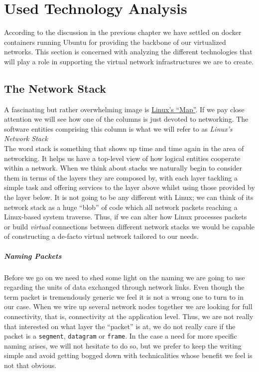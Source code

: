 \chapter{Used Technology Analysis} \label{chap:2}
    According to the discussion in the previous chapter we have settled on docker containers running Ubuntu for providing the backbone of our virtualized networks. This section is concerned with analyzing the different technologies that will play a role in supporting the virtual network infrastructures we are to create.\\

    \section{The Network Stack}
        A fascinating but rather overwhelming image is \href{https://upload.wikimedia.org/wikipedia/commons/5/5b/Linux_kernel_map.png}{Linux's ``Map''}. If we pay close attention we will see how one of the columns is just devoted to networking. The software entities comprising this column is what we will refer to as \textit{Linux's Network Stack}\\

         The word stack is something that shows up time and time again in the area of networking. It helps us have a top-level view of how logical entities cooperate within a network. When we think about stacks we naturally begin to consider them in terms of the layers they are composed by, with each layer tackling a simple task and offering services to the layer above whilst using those provided by the layer below. It is not going to be any different with Linux; we can think of its network stack as a huge ``blob'' of code which all network packets reaching a Linux-based system traverse. Thus, if we can alter how Linux processes packets or build \textit{virtual} connections between different network stacks we would be capable of constructing a de-facto virtual network tailored to our needs.\\

         \paragraph{Naming Packets}
            Before we go on we need to shed some light on the naming we are going to use regarding the units of data exchanged through network links. Even though the term packet is tremendously generic we feel it is not a wrong one to turn to in our case. When we wire up several network nodes together we are looking for full connectivity, that is, connectivity at the application level. Thus, we are not really that interested on what layer the ``packet'' is at, we do not really care if the packet is a \texttt{segment}, \texttt{datagram} or \texttt{frame}. In the case a need for more specific naming arises, we will not hesitate to do so, but we prefer to keep the writing simple and avoid getting bogged down with technicalities whose benefit we feel is not that obvious.\\

